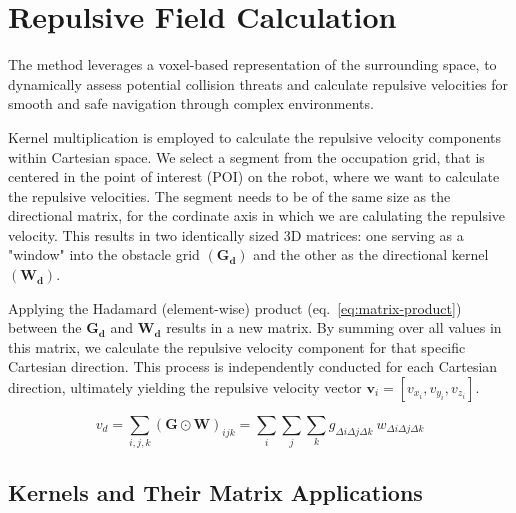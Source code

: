 \documentclass[letterpaper, 10 pt, conference]{ieeeconf}  %
\begin{document}
\section{Repulsive Field Calculation}
\label{section:repulsive_vel}

The method leverages a voxel-based representation of the surrounding space, to dynamically assess potential collision threats and calculate repulsive velocities for smooth and safe navigation through complex environments. 

Kernel multiplication is employed to calculate the repulsive velocity components within Cartesian space. We select a segment from the occupation grid, that is centered in the point of interest (POI) on the robot, where we want to calculate the repulsive velocities. The segment needs to be of the same size as the directional matrix, for the cordinate axis in which we are calulating the repulsive velocity. This results in two identically sized 3D matrices: one serving as a "window" into the obstacle grid $\mathbf{(G_d)}$ and the other as the directional kernel $\mathbf{(W_d)}$.

Applying the Hadamard (element-wise) product (eq.~\ref{eq:matrix-product}) between the $\mathbf{G_d}$ and $\mathbf{W_d}$ results in a new matrix. By summing over all values in this matrix, we calculate the repulsive velocity component for that specific Cartesian direction. This process is independently conducted for each Cartesian direction, ultimately yielding the repulsive velocity vector \(\mathbf{v}_i = [ v_{x_i}, v_{y_i}, v_{z_i}]\).

\begin{equation}
	v_d = \sum_{i,j,k} (\mathbf{G} \odot \mathbf{W})_{ijk} = \sum_{i}\sum_{j}\sum_{k} g_{\Delta i \Delta j \Delta k} ~  w_{\Delta i \Delta j \Delta k}
	\label{eq:matrix-product}
\end{equation}




\subsection{Kernels and Their Matrix Applications}
\end{document}
